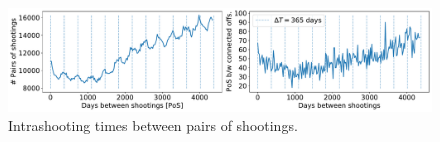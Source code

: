 \begin{figure}[t!] 
	\includegraphics[width=\textwidth]{figs/intrashooting_times} 
	\caption{Intrashooting times between pairs of shootings.}
\label{fig:intrashooting_time}
\end{figure}